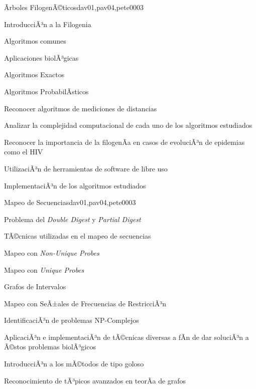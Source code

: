 \begin{syllabus}
\begin{unit}{Ãrboles FilogenÃ©ticos}{dav01,pav04,pete00}{0}{3}
\begin{topics}
        \item IntroducciÃ³n a la Filogenia
        \item Algoritmos comunes
        \item Aplicaciones biolÃ³gicas
        \item Algoritmos Exactos
        \item Algoritmos ProbabilÃ­sticos
    \end{topics}
    \begin{learningoutcomes}
        \item Reconocer algoritmos de mediciones de distancias
        \item Analizar la complejidad computacional de cada uno de los algoritmos estudiados
        \item Reconocer la importancia de la filogenÃ­a en casos de evoluciÃ³n de epidemias como el HIV
        \item UtilizaciÃ³n de herramientas de software de libre uso
        \item ImplementaciÃ³n de los algoritmos estudiados
    \end{learningoutcomes}
\end{unit}

\begin{unit}{Mapeo de Secuencias}{dav01,pav04,pete00}{0}{3}
\begin{topics}
        \item Problema del \textit{Double Digest} y \textit{Partial Digest}
        \item TÃ©cnicas utilizadas en el mapeo de secuencias
        \item Mapeo con \textit{Non-Unique Probes}
        \item Mapeo con \textit{Unique Probes}
        \item Grafos de Intervalos
        \item Mapeo con SeÃ±ales de Frecuencias de RestricciÃ³n
    \end{topics}
    \begin{learningoutcomes}
        \item IdentificaciÃ³n de problemas NP-Complejos
        \item AplicaciÃ³n e implementaciÃ³n de tÃ©cnicas diversas a fÃ­n de dar soluciÃ³n a Ã©stos problemas biolÃ³gicos
        \item IntroducciÃ³n a los mÃ©todos de tipo goloso
        \item Reconocimiento de tÃ³picos avanzados en teorÃ­a de grafos
    \end{learningoutcomes}
\end{unit}


\end{syllabus}
